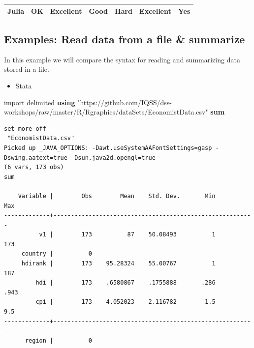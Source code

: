 \documentclass[]{book}
\newenvironment{Shaded}{\begin{snugshade}}{\end{snugshade}}
\newcommand{\KeywordTok}[1]{\textcolor[rgb]{0.13,0.29,0.53}{\textbf{#1}}}
\newcommand{\NormalTok}[1]{#1}
\newcommand{\StringTok}[1]{\textcolor[rgb]{0.31,0.60,0.02}{#1}}
\providecommand{\tightlist}{%
  \setlength{\itemsep}{0pt}\setlength{\parskip}{0pt}}
\begin{document}
\begin{longtable}[]{@{}lllllll@{}}
\begin{minipage}[t]{0.08\columnwidth}\raggedright
Julia\strut
\end{minipage} & \begin{minipage}[t]{0.10\columnwidth}\raggedright
OK\strut
\end{minipage} & \begin{minipage}[t]{0.13\columnwidth}\raggedright
Excellent\strut
\end{minipage} & \begin{minipage}[t]{0.16\columnwidth}\raggedright
Good\strut
\end{minipage} & \begin{minipage}[t]{0.11\columnwidth}\raggedright
Hard\strut
\end{minipage} & \begin{minipage}[t]{0.17\columnwidth}\raggedright
Excellent\strut
\end{minipage} & \begin{minipage}[t]{0.05\columnwidth}\raggedright
Yes\strut
\end{minipage}\tabularnewline
\bottomrule
\end{longtable}

\hypertarget{examples-read-data-from-a-file-summarize}{%
\subsection{Examples: Read data from a file \& summarize}\label{examples-read-data-from-a-file-summarize}}

In this example we will compare the syntax for reading and summarizing data stored in a file.

\begin{itemize}
\tightlist
\item
  Stata
\end{itemize}

\begin{Shaded}
\begin{Highlighting}[]
\NormalTok{import delimited }\KeywordTok{using} \StringTok{"https://github.com/IQSS/dss-workshops/raw/master/R/Rgraphics/dataSets/EconomistData.csv"}
\KeywordTok{sum}
\end{Highlighting}
\end{Shaded}

\begin{verbatim}
set more off
 "EconomistData.csv"
Picked up _JAVA_OPTIONS: -Dawt.useSystemAAFontSettings=gasp -Dswing.aatext=true -Dsun.java2d.opengl=true
(6 vars, 173 obs)
sum

    Variable |        Obs        Mean    Std. Dev.       Min        Max
-------------+---------------------------------------------------------
          v1 |        173          87    50.08493          1        173
     country |          0
     hdirank |        173    95.28324    55.00767          1        187
         hdi |        173    .6580867    .1755888       .286       .943
         cpi |        173    4.052023    2.116782        1.5        9.5
-------------+---------------------------------------------------------
      region |          0
\end{verbatim}
\end{document}
